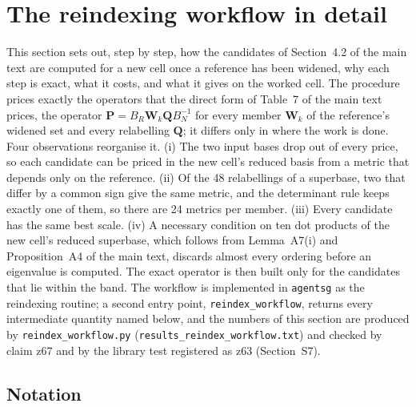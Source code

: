 \documentclass[preprint,pdf]{iucr}          %
\newcommand{\Pop}{\mathbf{P}}
\newcommand{\Wop}{\mathbf{W}}
\begin{document}
\section{The reindexing workflow in detail}\label{si:workflow}

This section sets out, step by step, how the candidates of Section~4.2 of the main text are computed for a new cell once a reference has been widened, why each step is exact, what it costs, and what it gives on the worked cell. The procedure prices exactly the operators that the direct form of Table~7 of the main text prices, the operator $\Pop=B_R\Wop_k\mathbf QB_N^{-1}$ for every member $\Wop_k$ of the reference's widened set and every relabelling $\mathbf Q$; it differs only in where the work is done. Four observations reorganise it. (i) The two input bases drop out of every price, so each candidate can be priced in the new cell's reduced basis from a metric that depends only on the reference. (ii) Of the 48 relabellings of a superbase, two that differ by a common sign give the same metric, and the determinant rule keeps exactly one of them, so there are 24 metrics per member. (iii) Every candidate has the same best scale. (iv) A necessary condition on ten dot products of the new cell's reduced superbase, which follows from Lemma~A7(i) and Proposition~A4 of the main text, discards almost every ordering before an eigenvalue is computed. The exact operator is then built only for the candidates that lie within the band. The workflow is implemented in \texttt{agentsg} as the reindexing routine; a second entry point, \texttt{reindex\_workflow}, returns every intermediate quantity named below, and the numbers of this section are produced by \texttt{reindex\_workflow.py} (\texttt{results\_\allowbreak reindex\_\allowbreak workflow.txt}) and checked by claim z67 and by the library test registered as z63 (Section~S7).

\subsection{Notation}
\end{document}
